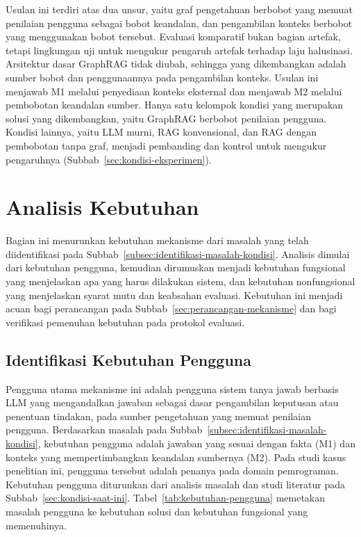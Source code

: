Usulan ini terdiri atas dua unsur, yaitu graf pengetahuan berbobot yang memuat penilaian pengguna sebagai bobot keandalan, dan pengambilan konteks berbobot yang menggunakan bobot tersebut. Evaluasi komparatif bukan bagian artefak, tetapi lingkungan uji untuk mengukur pengaruh artefak terhadap laju halusinasi. Arsitektur dasar GraphRAG tidak diubah, sehingga yang dikembangkan adalah sumber bobot dan penggunaannya pada pengambilan konteks. Usulan ini menjawab M1 melalui penyediaan konteks eksternal dan menjawab M2 melalui pembobotan keandalan sumber. Hanya satu kelompok kondisi yang merupakan solusi yang dikembangkan, yaitu GraphRAG berbobot penilaian pengguna. Kondisi lainnya, yaitu LLM murni, RAG konvensional, dan RAG dengan pembobotan tanpa graf, menjadi pembanding dan kontrol untuk mengukur pengaruhnya (Subbab~\ref{sec:kondisi-eksperimen}).


\section{Analisis Kebutuhan}
\label{sec:analisis-kebutuhan}

Bagian ini menurunkan kebutuhan mekanisme dari masalah yang telah diidentifikasi pada Subbab~\ref{subsec:identifikasi-masalah-kondisi}. Analisis dimulai dari kebutuhan pengguna, kemudian dirumuskan menjadi kebutuhan fungsional yang menjelaskan apa yang harus dilakukan sistem, dan kebutuhan nonfungsional yang menjelaskan syarat mutu dan keabsahan evaluasi. Kebutuhan ini menjadi acuan bagi perancangan pada Subbab~\ref{sec:perancangan-mekanisme} dan bagi verifikasi pemenuhan kebutuhan pada protokol evaluasi.

\subsection{Identifikasi Kebutuhan Pengguna}
\label{subsec:identifikasi-kebutuhan-pengguna}

Pengguna utama mekanisme ini adalah pengguna sistem tanya jawab berbasis LLM yang mengandalkan jawaban sebagai dasar pengambilan keputusan atau penentuan tindakan, pada sumber pengetahuan yang memuat penilaian pengguna. Berdasarkan masalah pada Subbab~\ref{subsec:identifikasi-masalah-kondisi}, kebutuhan pengguna adalah jawaban yang sesuai dengan fakta (M1) dan konteks yang mempertimbangkan keandalan sumbernya (M2). Pada studi kasus penelitian ini, pengguna tersebut adalah penanya pada domain pemrograman. Kebutuhan pengguna diturunkan dari analisis masalah dan studi literatur pada Subbab~\ref{sec:kondisi-saat-ini}. Tabel~\ref{tab:kebutuhan-pengguna} memetakan masalah pengguna ke kebutuhan solusi dan kebutuhan fungsional yang memenuhinya.


